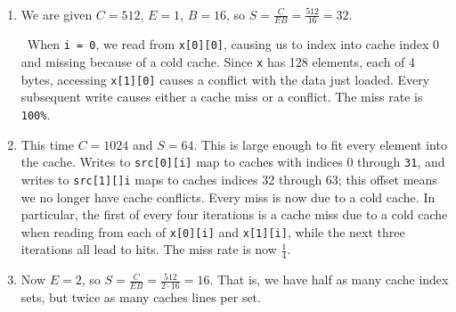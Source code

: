 \documentclass[12pt]{article}
\newenvironment{sol}[1][Solution]{\begin{trivlist}
		\item[\hskip \labelsep {\bfseries #1:}]}{\end{trivlist}}
\begin{document}
\begin{sol}
	\
	\begin{enumerate}[label=(\alph*)]
		\item We are given $C=512$, $E=1$, $B=16$, so $S=\frac{C}{EB}=\frac{512}{16}=32$.
		
		\
		When \texttt{i = 0}, we read from \texttt{x[0][0]}, causing us to index into cache index 0 and missing
		because of a cold cache. Since \texttt{x} has 128 elements, each of 4 bytes, accessing \texttt{x[1][0]}
		causes a conflict with the data just loaded. Every subsequent write causes either a cache miss or a conflict.
		The miss rate is \texttt{100\%}.
		
		\item This time $C=1024$ and $S=64$. This is large enough to fit every element into the cache.
		Writes to \texttt{src[0][i]} map to caches with indices 0 through \texttt{31}, and writes to
		\texttt{src[1][]i} maps to caches indices 32 through 63; this offset means we no longer have cache
		conflicts. Every miss is now due to a cold cache. In particular, the first of every four iterations is
		a cache miss due to a cold cache when reading from each of \texttt{x[0][i]} and \texttt{x[1][i]},
		while the next three iterations all lead to hits. The miss rate is now $\frac{1}{4}$.
		\item Now $E=2$, so $S=\frac{C}{EB}=\frac{512}{2\cdot 16}=16$. That is, we have half as many cache index
		sets, but twice as many caches lines per set.
		

\end{enumerate}
\end{sol}
\end{document}
